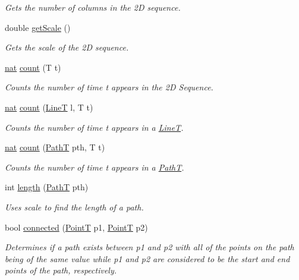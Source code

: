\begin{DoxyCompactItemize}
$$\begin{DoxyCompactList}\small\item\em Gets the number of columns in the 2D sequence. \end{DoxyCompactList}\item 
double \mbox{\hyperlink{class_seq2_d_a6d4fe7251d0867677d6a84a7c3fbb959}{get\+Scale}} ()
\begin{DoxyCompactList}\small\item\em Gets the scale of the 2D sequence. \end{DoxyCompactList}\item 
\mbox{\hyperlink{_path_a_d_t_8h_a56638ee9d162e8cce3a15f92d2023d6e}{nat}} \mbox{\hyperlink{class_seq2_d_a7c1a0f4d5c1c27c0ad123f86e6b54904}{count}} (T t)
\begin{DoxyCompactList}\small\item\em Counts the number of time t appears in the 2D Sequence. \end{DoxyCompactList}\item 
\mbox{\hyperlink{_path_a_d_t_8h_a56638ee9d162e8cce3a15f92d2023d6e}{nat}} \mbox{\hyperlink{class_seq2_d_ac57bbdcbb5d743363ce464acd6286eff}{count}} (\mbox{\hyperlink{class_line_t}{LineT}} l, T t)
\begin{DoxyCompactList}\small\item\em Counts the number of time t appears in a \mbox{\hyperlink{class_line_t}{LineT}}. \end{DoxyCompactList}\item 
\mbox{\hyperlink{_path_a_d_t_8h_a56638ee9d162e8cce3a15f92d2023d6e}{nat}} \mbox{\hyperlink{class_seq2_d_a81e5e36a3928888b4dbc8732ac3e8d5f}{count}} (\mbox{\hyperlink{class_path_t}{PathT}} pth, T t)
\begin{DoxyCompactList}\small\item\em Counts the number of time t appears in a \mbox{\hyperlink{class_path_t}{PathT}}. \end{DoxyCompactList}\item 
int \mbox{\hyperlink{class_seq2_d_ac950d78724ce1154292628c87596ac69}{length}} (\mbox{\hyperlink{class_path_t}{PathT}} pth)
\begin{DoxyCompactList}\small\item\em Uses scale to find the length of a path. \end{DoxyCompactList}\item 
bool \mbox{\hyperlink{class_seq2_d_ac5131076ac848c7e2e1a6be678d4437b}{connected}} (\mbox{\hyperlink{class_point_t}{PointT}} p1, \mbox{\hyperlink{class_point_t}{PointT}} p2)
\begin{DoxyCompactList}\small\item\em Determines if a path exists between p1 and p2 with all of the points on the path being of the same value while p1 and p2 are considered to be the start and end points of the path, respectively. \end{DoxyCompactList}\end{DoxyCompactItemize}


